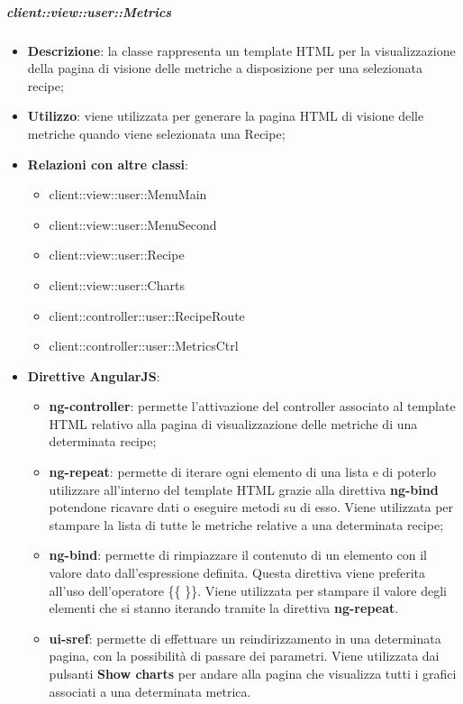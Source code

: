 		\subparagraph{client::view::user::Metrics} %
		\label{subp:bdsm_app_client_view_metrics}

			\begin{itemize}
				\item \textbf{Descrizione}: la classe rappresenta un template HTML per la visualizzazione della pagina di visione delle metriche a disposizione per una selezionata recipe;
				\item \textbf{Utilizzo}: viene utilizzata per generare la pagina HTML di visione delle metriche quando viene selezionata una Recipe;
				\item \textbf{Relazioni con altre classi}:
					\begin{itemize}
						\item client::view::user::MenuMain
						\item client::view::user::MenuSecond
						\item client::view::user::Recipe
						\item client::view::user::Charts
						\item client::controller::user::RecipeRoute
						\item client::controller::user::MetricsCtrl
					\end{itemize}
				\item \textbf{Direttive AngularJS}:
					\begin{itemize}
						\item \textbf{ng-controller}: permette l'attivazione del controller associato al template HTML relativo alla pagina di visualizzazione delle metriche di una determinata recipe;
						\item \textbf{ng-repeat}: permette di iterare ogni elemento di una lista e di poterlo utilizzare all'interno del template HTML grazie alla direttiva \textbf{ng-bind} potendone ricavare dati o eseguire metodi su di esso. Viene utilizzata per stampare la lista di tutte le metriche relative a una determinata recipe;
						\item \textbf{ng-bind}: permette di rimpiazzare il contenuto di un elemento con il valore dato dall'espressione definita. Questa direttiva viene preferita all'uso dell'operatore \{\{ \}\}. Viene utilizzata per stampare il valore degli elementi che si stanno iterando tramite la direttiva \textbf{ng-repeat}.
						\item \textbf{ui-sref}: permette di effettuare un reindirizzamento in una determinata pagina, con la possibilità di passare dei parametri. Viene utilizzata dai pulsanti \textbf{Show charts} per andare alla pagina che visualizza tutti i grafici associati a una determinata metrica. 
					\end{itemize}
			\end{itemize}

